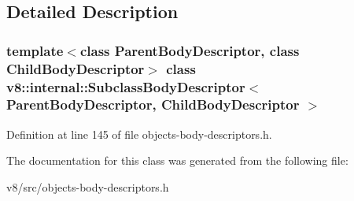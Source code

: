 \subsection{Detailed Description}
\subsubsection*{template$<$class Parent\+Body\+Descriptor, class Child\+Body\+Descriptor$>$\newline
class v8\+::internal\+::\+Subclass\+Body\+Descriptor$<$ Parent\+Body\+Descriptor, Child\+Body\+Descriptor $>$}



Definition at line 145 of file objects-\/body-\/descriptors.\+h.



The documentation for this class was generated from the following file\+:\begin{DoxyCompactItemize}
\item 
v8/src/objects-\/body-\/descriptors.\+h\end{DoxyCompactItemize}
